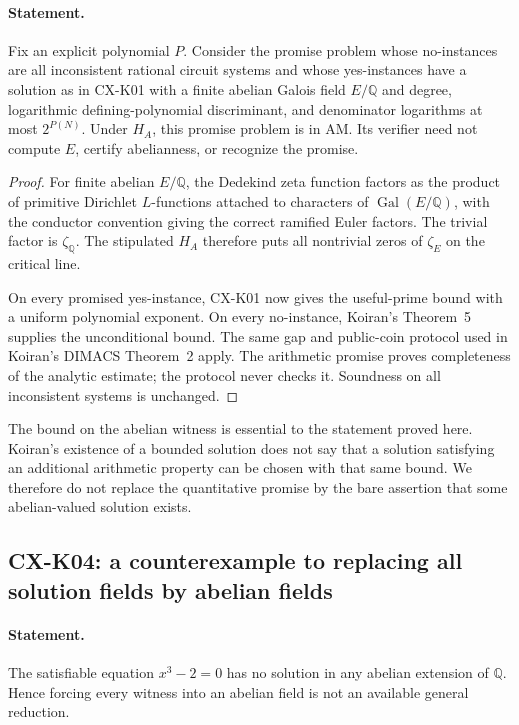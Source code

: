 \paragraph{Statement.}
Fix an explicit polynomial $P$. Consider the promise problem whose
no-instances are all inconsistent rational circuit systems and whose
yes-instances have a solution as in CX-K01 with a finite abelian
Galois field $E/\mathbb Q$ and degree, logarithmic defining-polynomial
discriminant, and denominator logarithms at most $2^{P(N)}$.
Under $H_A$, this promise problem is in AM. Its verifier need not
compute $E$, certify abelianness, or recognize the promise.

\begin{proof}
For finite abelian $E/\mathbb Q$, the Dedekind zeta function factors
as the product of primitive Dirichlet $L$-functions attached to
characters of $\operatorname{Gal}(E/\mathbb Q)$, with the conductor
convention giving the correct ramified Euler factors. The trivial
factor is $\zeta_{\mathbb Q}$. The stipulated $H_A$ therefore puts
all nontrivial zeros of $\zeta_E$ on the critical line.

On every promised yes-instance, CX-K01 now gives the useful-prime
bound with a uniform polynomial exponent. On every no-instance,
Koiran's Theorem~5 supplies the unconditional bound. The same gap
and public-coin protocol used in Koiran's DIMACS Theorem~2 apply.
The arithmetic promise proves completeness of the analytic estimate;
the protocol never checks it. Soundness on all inconsistent systems
is unchanged.
\end{proof}

The bound on the abelian witness is essential to the statement proved
here. Koiran's existence of a bounded solution does not say that a
solution satisfying an additional arithmetic property can be chosen
with that same bound. We therefore do not replace the quantitative
promise by the bare assertion that some abelian-valued solution exists.

\subsection{CX-K04: a counterexample to replacing all solution fields by abelian fields}
\label{cx:k04}

\paragraph{Statement.}
The satisfiable equation $x^3-2=0$ has no solution in any abelian
extension of $\mathbb Q$. Hence forcing every witness into an abelian
field is not an available general reduction.

